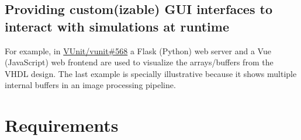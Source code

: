 \documentclass[
]{article}
\begin{document}
\hypertarget{providing-customizable-gui-interfaces-to-interact-with-simulations-at-runtime}{%
\subsection{Providing custom(izable) GUI interfaces to interact with simulations at runtime}\label{providing-customizable-gui-interfaces-to-interact-with-simulations-at-runtime}}

For example, in \href{https://github.com/VUnit/vunit/pull/568}{VUnit/vunit\#568} a Flask (Python) web server and a Vue (JavaScript) web frontend are used to visualize the arrays/buffers from the VHDL design. The last example is specially illustrative because it shows multiple internal buffers in an image processing pipeline.

\hypertarget{requirements}{%
\section{Requirements}\label{requirements}}
\end{document}
